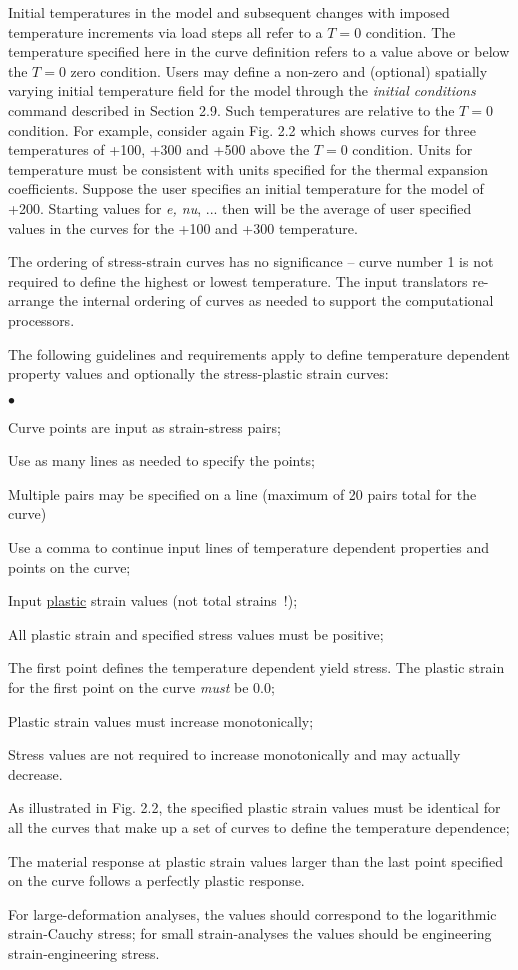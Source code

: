 \documentclass[11pt]{report}
\numberwithin{equation}{section}
\newcommand{\ul} {\underline}
\newcommand{\ti}{\emph}
\newcommand{\squishlist}{
 \begin{list}{$\bullet$}
  { \setlength{\itemsep}{0pt}
     \setlength{\parsep}{3pt}
     \setlength{\topsep}{3pt}
     \setlength{\partopsep}{0pt}
     \setlength{\leftmargin}{1.5em}
     \setlength{\labelwidth}{1em}
     \setlength{\labelsep}{0.5em} } }
\newcommand{\squishend}{
  \end{list}  }
\begin{document}
Initial temperatures in the model and subsequent changes 
with imposed temperature increments via load steps
all refer to a $T=0$ condition. The temperature specified 
here in the curve definition 
refers to a value above or below the $T=0$ zero condition. Users may
define a non-zero and (optional) spatially varying initial temperature field
for the model through the \ti{initial conditions} command described in Section 2.9.
Such temperatures are relative to the $T=0$ condition.
For example, consider again Fig. 2.2 which shows curves for three
temperatures of +100, +300 and +500 above the $T=0$
condition. Units for temperature must be consistent with units specified for the 
thermal expansion coefficients.
Suppose the user specifies an initial
temperature for the model of +200. Starting values for \ti{e, nu}, ...
then will be the average of user specified values in the curves for the +100 and +300
temperature. 

The ordering of stress-strain curves has no significance -- curve number 1
is not required to define the highest or lowest temperature. The input
translators re-arrange the internal ordering of curves as needed to support the
computational processors.

The following guidelines and requirements apply to define temperature dependent
property values and optionally the stress-plastic strain curves:
\small \squishlist
\item Curve points are input as strain-stress pairs;
\item Use as many lines as needed to specify the points;
\item Multiple pairs may be specified on a line (maximum of 20 pairs total for
the curve)
\item Use a comma to continue input lines of temperature dependent properties and
points on the curve;
\item Input \ul{plastic} strain values (not total strains\ !); 
\item All plastic strain and specified stress values must be positive;
\item The first point defines the temperature dependent yield stress. The
plastic strain for the first point on the curve \ti{must} be 0.0;
\item Plastic strain values must increase monotonically;
\item Stress values are not required to increase monotonically and may
actually decrease. 
\item As illustrated in Fig. 2.2, the specified plastic strain values must be identical
for all the curves that make up a set of curves to define the temperature
dependence;
\item The material response at plastic strain values larger than the last
point specified on the curve follows a perfectly plastic response.
\squishend \normalsize
For large-deformation analyses, the values should correspond to the logarithmic
strain-Cauchy stress; for small strain-analyses the values should be engineering
strain-engineering stress. 
\end{document}
